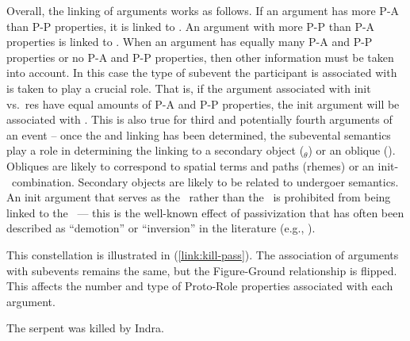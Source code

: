 \documentclass[output=paper,hidelinks]{langscibook}
\begin{document}
Overall, the linking of arguments works as follows. 
If an argument has more P-A than P-P properties,  it is linked to  {\SUBJ}. An argument with more P-P than P-A properties is linked to {\OBJ}. When an argument has equally many P-A and P-P properties or no P-A and P-P properties, then other information must be taken into account. In this case  the type of subevent the participant is associated with is taken to play a crucial role. That is, if the argument associated with init vs.~res have equal amounts of P-A and P-P properties, the init argument will be associated with \SUBJ.  This is also true for third and potentially fourth arguments of an event -- once the {\SUBJ} and {\OBJ} linking has been determined, the subevental semantics  play a role in determining the linking to a secondary object ({\OBJ}$_\theta$) or an oblique (\OBL). Obliques are likely to correspond to spatial terms and paths (rhemes) or an init-\GR\ combination. Secondary objects are likely to be related to undergoer semantics.  An init argument that serves as the {\GR}\ rather than the \FIG\  is prohibited from being linked to the \SUBJ\ --- this is the well-known effect of passivization that has often been described as ``demotion'' or ``inversion'' in the literature (e.g., \citealt{perlmutter1977toward}). 

This constellation is illustrated in (\ref{link:kill-pass}).  The association of arguments with subevents remains the same, but the Figure-Ground relationship is flipped.  This affects the number and type of Proto-Role properties associated with each argument.  


\ea \label{link:kill-pass}
The serpent was killed by Indra. 

 \hspace{1.1cm}
\z 
\end{document}
